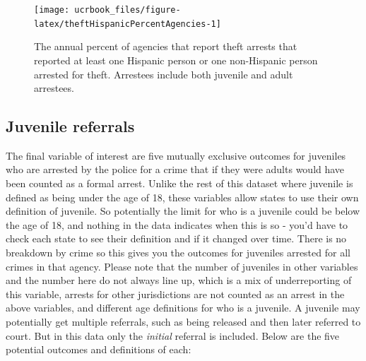 \documentclass[
  12pt,
  openany]{book}
\begin{document}
\begin{figure}

{\centering \texttt{[image: ucrbook\_files/figure-latex/theftHispanicPercentAgencies-1]} 

}

\caption{The annual percent of agencies that report theft arrests that reported at least one Hispanic person or one non-Hispanic person arrested for theft. Arrestees include both juvenile and adult arrestees.}\label{fig:theftHispanicPercentAgencies}
\end{figure}

\hypertarget{juvenile-referrals}{%
\subsection{Juvenile referrals}\label{juvenile-referrals}}

The final variable of interest are five mutually exclusive outcomes for juveniles who are arrested by the police for a crime that if they were adults would have been counted as a formal arrest. Unlike the rest of this dataset where juvenile is defined as being under the age of 18, these variables allow states to use their own definition of juvenile. So potentially the limit for who is a juvenile could be below the age of 18, and nothing in the data indicates when this is so - you'd have to check each state to see their definition and if it changed over time. There is no breakdown by crime so this gives you the outcomes for juveniles arrested for all crimes in that agency. Please note that the number of juveniles in other variables and the number here do not always line up, which is a mix of underreporting of this variable, arrests for other jurisdictions are not counted as an arrest in the above variables, and different age definitions for who is a juvenile. A juvenile may potentially get multiple referrals, such as being released and then later referred to court. But in this data only the \emph{initial} referral is included. Below are the five potential outcomes and definitions of each:
\end{document}
